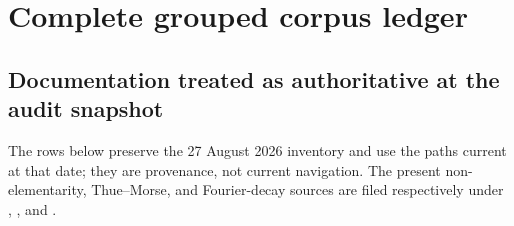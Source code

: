 \documentclass[11pt,oneside]{article}
\numberwithin{equation}{section}
\theoremstyle{definition}
\theoremstyle{remark}
\begin{document}
\appendix

\section{Complete grouped corpus ledger}
\label{p3:app:corpus}

\subsection{Documentation treated as authoritative at the audit snapshot}

The rows below preserve the 27 August 2026 inventory and use the paths current
at that date; they are provenance, not current navigation.  The present
non-elementarity, Thue--Morse, and Fourier-decay sources are filed respectively
under ,
, and
.
\end{document}
